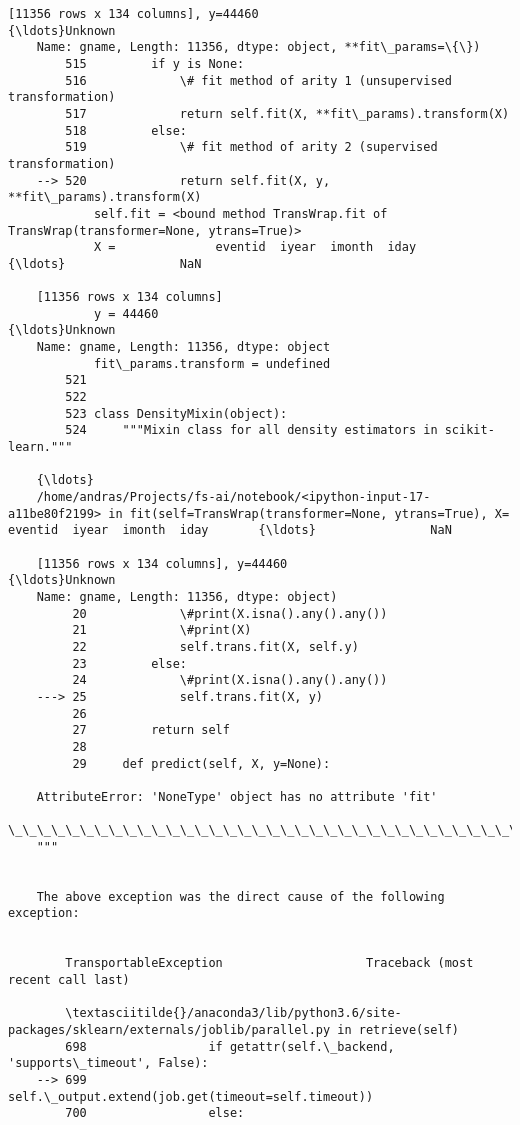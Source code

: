 \documentclass[11pt]{article}
\begin{document}
\begin{Verbatim}[commandchars=\\\{\}]
    [11356 rows x 134 columns], y=44460                                           {\ldots}Unknown
    Name: gname, Length: 11356, dtype: object, **fit\_params=\{\})
        515         if y is None:
        516             \# fit method of arity 1 (unsupervised transformation)
        517             return self.fit(X, **fit\_params).transform(X)
        518         else:
        519             \# fit method of arity 2 (supervised transformation)
    --> 520             return self.fit(X, y, **fit\_params).transform(X)
            self.fit = <bound method TransWrap.fit of TransWrap(transformer=None, ytrans=True)>
            X =              eventid  iyear  imonth  iday       {\ldots}                NaN  
    
    [11356 rows x 134 columns]
            y = 44460                                           {\ldots}Unknown
    Name: gname, Length: 11356, dtype: object
            fit\_params.transform = undefined
        521 
        522 
        523 class DensityMixin(object):
        524     """Mixin class for all density estimators in scikit-learn."""
    
    {\ldots}
    /home/andras/Projects/fs-ai/notebook/<ipython-input-17-a11be80f2199> in fit(self=TransWrap(transformer=None, ytrans=True), X=             eventid  iyear  imonth  iday       {\ldots}                NaN  
    
    [11356 rows x 134 columns], y=44460                                           {\ldots}Unknown
    Name: gname, Length: 11356, dtype: object)
         20             \#print(X.isna().any().any())
         21             \#print(X)
         22             self.trans.fit(X, self.y)
         23         else:
         24             \#print(X.isna().any().any())
    ---> 25             self.trans.fit(X, y)
         26         
         27         return self
         28 
         29     def predict(self, X, y=None):
    
    AttributeError: 'NoneType' object has no attribute 'fit'
    \_\_\_\_\_\_\_\_\_\_\_\_\_\_\_\_\_\_\_\_\_\_\_\_\_\_\_\_\_\_\_\_\_\_\_\_\_\_\_\_\_\_\_\_\_\_\_\_\_\_\_\_\_\_\_\_\_\_\_\_\_\_\_\_\_\_\_\_\_\_\_\_\_\_\_
    """

        
    The above exception was the direct cause of the following exception:


        TransportableException                    Traceback (most recent call last)

        \textasciitilde{}/anaconda3/lib/python3.6/site-packages/sklearn/externals/joblib/parallel.py in retrieve(self)
        698                 if getattr(self.\_backend, 'supports\_timeout', False):
    --> 699                     self.\_output.extend(job.get(timeout=self.timeout))
        700                 else:



\end{Verbatim}
\end{document}
